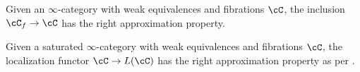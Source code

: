 \begin{exmp}
  Given an $\infty$-category with weak equivalences and fibrations $\cC$, the
  inclusion $\cC_f\rightarrow\cC$ has the right approximation property.
\end{exmp}

\begin{exmp}\label{764}
  Given a saturated $\infty$-category with weak equivalences and fibrations
  $\cC$, the localization functor $\cC\rightarrow L(\cC)$ has the right
  approximation property as per \cite[Ex.\ 7.6.4]{Cis19}.
\end{exmp}



